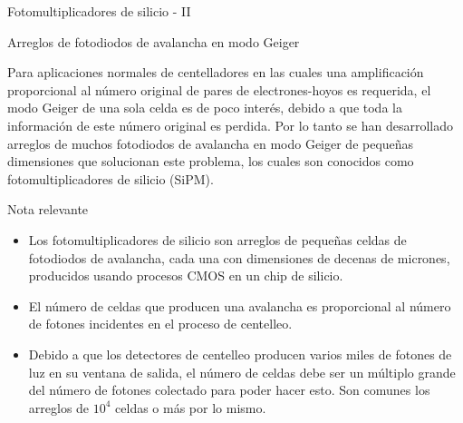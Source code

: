 \documentclass[a4paper,10pt]{beamer}
\begin{document}
\begin{frame}{Fotomultiplicadores de silicio - II}
 
 {\large{\color{blue}Arreglos de fotodiodos de avalancha en modo Geiger}}
 
 \begin{justify}
 \small
  Para aplicaciones normales de centelladores en las cuales una amplificación proporcional 
  al número original de pares de electrones-hoyos es requerida, el modo Geiger de una 
  sola celda es de poco interés, debido a que toda la información de este número 
  original es perdida. Por lo tanto se han desarrollado arreglos de muchos fotodiodos 
  de avalancha en modo Geiger de pequeñas dimensiones que solucionan este problema, 
  los cuales son conocidos como fotomultiplicadores de silicio (SiPM).
 \end{justify}
 
 \begin{block}{Nota relevante}
  \begin{itemize}[<+->]
   \item \begin{justify}
          Los fotomultiplicadores de silicio son arreglos de pequeñas celdas de 
          fotodiodos de avalancha, cada una con dimensiones de decenas de micrones, 
          producidos usando procesos CMOS en un chip de silicio.
         \end{justify}
   \item \begin{justify}
          El número de celdas que producen una avalancha es proporcional al número de 
          fotones incidentes en el proceso de centelleo.
         \end{justify}
   \item \begin{justify}
          Debido a que los detectores de centelleo producen varios miles de fotones 
          de luz en su ventana de salida, el número de celdas debe ser un múltiplo 
          grande del número de fotones colectado para poder hacer esto. Son comunes 
          los arreglos de $10^4$ celdas o más por lo mismo.
         \end{justify}
  \end{itemize}

 \end{block}

\end{frame}
\end{document}
